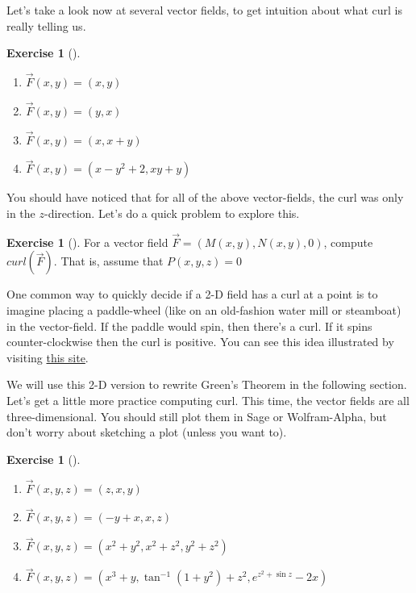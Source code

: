 \documentclass[10pt,]{book}
\theoremstyle{plain}
\theoremstyle{definition}
\theoremstyle{definition}
\theoremstyle{definition}
\theoremstyle{definition}
\newtheorem{exploration}[project]{Exercise}
\theoremstyle{definition}
\numberwithin{equation}{section}
\begin{document}
Let's take a look now at several vector fields, to get intuition about what curl is really telling us.%
\begin{exploration}[]\label{x2dcurl}
\leavevmode%
\begin{enumerate}[font=\bfseries,label=(\alph*),ref=\alph*]
\item\label{task-786} \(\vec{F}(x,y)=(x,y)\)%
\item\label{task-787} \(\vec{F}(x,y)=(y,x)\)%
\item\label{task-788} \(\vec{F}(x,y)=(x,x+y)\)%
\item\label{task-789} \(\vec{F}(x,y)=(x-y^2+2, xy+y)\)%
\end{enumerate}
\end{exploration}
You should have noticed that for all of the above vector-fields, the curl was only in the \(z\)-direction. Let's do a quick problem to explore this.%
\begin{exploration}[]\label{show2dcurl}
For a vector field \(\vec{F}= ( M(x,y), N(x,y), 0 )\), compute \(curl( \vec{F})\). That is, assume that \(P(x,y,z)=0\)%
\end{exploration}
One common way to quickly decide if a 2-D field has a curl at a point is to imagine placing a paddle-wheel (like on an old-fashion water mill or steamboat) in the vector-field. If the paddle would spin, then there's a curl. If it spins counter-clockwise then the curl is positive. You can see this idea illustrated by visiting \href{http://www.math.harvard.edu/\~knill/pitf/2dcurldiv.html}{this site}.%
\par
We will use this 2-D version to rewrite Green's Theorem in the following section. Let's get a little more practice computing curl. This time, the vector fields are all three-dimensional. You should still plot them in Sage or Wolfram-Alpha, but don't worry about sketching a plot (unless you want to).%
\begin{exploration}[]\label{x3dcurl}
\leavevmode%
\begin{enumerate}[font=\bfseries,label=(\alph*),ref=\alph*]
\item\label{task-790} \(\vec F(x,y,z) = \left(z,x,y \right)\)%
\item\label{task-791} \(\vec F(x,y,z) = \left(-y+x,x,z \right)\)%
\item\label{task-792} \(\vec F(x,y,z) = \left(x^2+y^2,x^2+z^2,y^2+z^2 \right)\)%
\item\label{task-793} \(\vec F(x,y,z) = \left(x^3+y,\tan^{-1}(1+y^2) + z^2,e^{z^2+\sin z} -2x\right)\)%
\end{enumerate}
\end{exploration}
\typeout{************************************************}
\typeout{************************************************}
\end{document}
